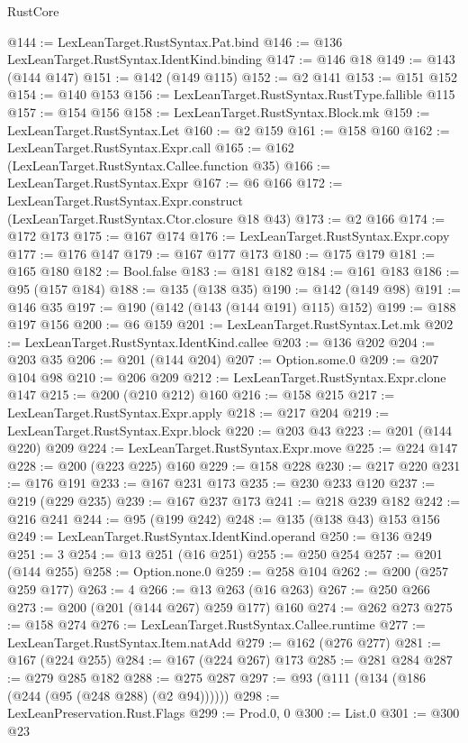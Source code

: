 \begin{lexlean}{RustCore}
\begin{coremodule}
@144 := LexLeanTarget.RustSyntax.Pat.bind
@146 := @136 LexLeanTarget.RustSyntax.IdentKind.binding
@147 := @146 @18
@149 := @143 (@144 @147)
@151 := @142 (@149 @115)
@152 := @2 @141
@153 := @151 @152
@154 := @140 @153
@156 := LexLeanTarget.RustSyntax.RustType.fallible @115
@157 := @154 @156
@158 := LexLeanTarget.RustSyntax.Block.mk
@159 := LexLeanTarget.RustSyntax.Let
@160 := @2 @159
@161 := @158 @160
@162 := LexLeanTarget.RustSyntax.Expr.call
@165 := @162 (LexLeanTarget.RustSyntax.Callee.function @35)
@166 := LexLeanTarget.RustSyntax.Expr
@167 := @6 @166
@172 := LexLeanTarget.RustSyntax.Expr.construct (LexLeanTarget.RustSyntax.Ctor.closure @18 @43)
@173 := @2 @166
@174 := @172 @173
@175 := @167 @174
@176 := LexLeanTarget.RustSyntax.Expr.copy
@177 := @176 @147
@179 := @167 @177 @173
@180 := @175 @179
@181 := @165 @180
@182 := Bool.false
@183 := @181 @182
@184 := @161 @183
@186 := @95 (@157 @184)
@188 := @135 (@138 @35)
@190 := @142 (@149 @98)
@191 := @146 @35
@197 := @190 (@142 (@143 (@144 @191) @115) @152)
@199 := @188 @197 @156
@200 := @6 @159
@201 := LexLeanTarget.RustSyntax.Let.mk
@202 := LexLeanTarget.RustSyntax.IdentKind.callee
@203 := @136 @202
@204 := @203 @35
@206 := @201 (@144 @204)
@207 := Option.some.{0}
@209 := @207 @104 @98
@210 := @206 @209
@212 := LexLeanTarget.RustSyntax.Expr.clone @147
@215 := @200 (@210 @212) @160
@216 := @158 @215
@217 := LexLeanTarget.RustSyntax.Expr.apply
@218 := @217 @204
@219 := LexLeanTarget.RustSyntax.Expr.block
@220 := @203 @43
@223 := @201 (@144 @220) @209
@224 := LexLeanTarget.RustSyntax.Expr.move
@225 := @224 @147
@228 := @200 (@223 @225) @160
@229 := @158 @228
@230 := @217 @220
@231 := @176 @191
@233 := @167 @231 @173
@235 := @230 @233 @120
@237 := @219 (@229 @235)
@239 := @167 @237 @173
@241 := @218 @239 @182
@242 := @216 @241
@244 := @95 (@199 @242)
@248 := @135 (@138 @43) @153 @156
@249 := LexLeanTarget.RustSyntax.IdentKind.operand
@250 := @136 @249
@251 := 3
@254 := @13 @251 (@16 @251)
@255 := @250 @254
@257 := @201 (@144 @255)
@258 := Option.none.{0}
@259 := @258 @104
@262 := @200 (@257 @259 @177)
@263 := 4
@266 := @13 @263 (@16 @263)
@267 := @250 @266
@273 := @200 (@201 (@144 @267) @259 @177) @160
@274 := @262 @273
@275 := @158 @274
@276 := LexLeanTarget.RustSyntax.Callee.runtime
@277 := LexLeanTarget.RustSyntax.Item.natAdd
@279 := @162 (@276 @277)
@281 := @167 (@224 @255)
@284 := @167 (@224 @267) @173
@285 := @281 @284
@287 := @279 @285 @182
@288 := @275 @287
@297 := @93 (@111 (@134 (@186 (@244 (@95 (@248 @288) (@2 @94))))))
@298 := LexLeanPreservation.Rust.Flags
@299 := Prod.{0, 0}
@300 := List.{0}
@301 := @300 @23

\end{coremodule}
\end{lexlean}

